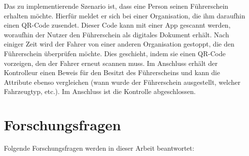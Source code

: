 Das zu implementierende Szenario ist, dass eine Person seinen Führerschein erhalten möchte. Hierfür meldet er sich bei einer Organisation, die ihm daraufhin einen QR-Code zusendet. Dieser Code kann mit einer App gescannt werden, woraufhin der Nutzer den Führerschein als digitales Dokument erhält. Nach einiger Zeit wird der Fahrer von einer anderen Organisation gestoppt, die den Führerschein überprüfen möchte. Dies geschieht, indem sie einen QR-Code vorzeigen, den der Fahrer erneut scannen muss. Im Anschluss erhält der Kontrolleur einen Beweis für den Besitzt des Führerscheins und kann die Attribute ebenso vergleichen (wann wurde der Führerschein ausgestellt, welcher Fahrzeugtyp, etc.). Im Anschluss ist die Kontrolle abgeschlossen.

\section{Forschungsfragen}
\label{forschungsfragen}
Folgende Forschungsfragen werden in dieser Arbeit beantwortet:
